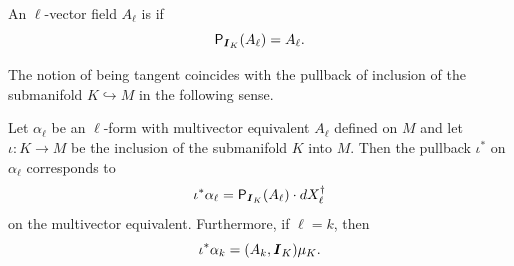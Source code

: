 \documentclass{article}
\begin{document}
\begin{definition}
An $\ell$-vector field $A_\ell$ is  if
\begin{equation}
    \mathsf{P}_{\boldsymbol{I}_K}(A_\ell)=A_\ell.
\end{equation}
\end{definition}
The notion of being tangent coincides with the pullback of inclusion of the submanifold $K\hookrightarrow M$ in the following sense.
\begin{proposition}
Let $\alpha_\ell$ be an $\ell$-form with multivector equivalent $A_\ell$ defined on $M$ and let $\iota \colon K \to M$ be the inclusion of the submanifold $K$ into $M$. Then the pullback $\iota^*$ on $\alpha_\ell$ corresponds to 
\begin{equation}
\iota^* \alpha_\ell = \mathsf{P}_{\boldsymbol{I}_K}(A_\ell) \cdot dX_\ell^\dagger
\end{equation}
on the multivector equivalent. Furthermore, if $\ell=k$, then
\begin{equation}
\label{eq:pullback_of_k_form}
    \iota^* \alpha_k = (A_k, \boldsymbol{I}_K) \mu_K.
\end{equation}
\end{proposition}
\end{document}
